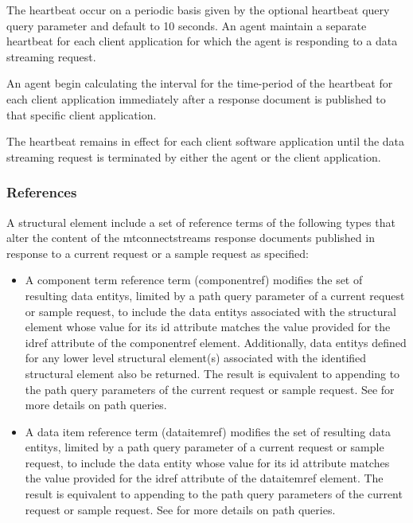 \documentclass{mtconnect}	%
\begin{document}
The \gls{heartbeat} \MUST occur on a periodic basis given by the optional \gls{heartbeat query} query parameter and \MUST default to 10 seconds.  An \gls{agent} \MUST maintain a separate \gls{heartbeat} for each client application for which the \gls{agent} is responding to a \gls{data streaming} \gls{request}.

An \gls{agent} \MUST begin calculating the interval for the time-period of the \gls{heartbeat} for each client application immediately after a \gls{response document} is published to that specific client application.

The \gls{heartbeat} remains in effect for each client software application until the \gls{data streaming} \gls{request} is terminated by either the \gls{agent} or the client application.


\subsubsection{References}
\label{sec:References}

A \gls{structural element} \MAY include a set of \glspl{reference term} of the following types that \MAY alter the content of the \glspl{mtconnectstreams response document} published in response to a \gls{current request} or a \gls{sample request} as specified:

\begin{itemize}
\item A \gls{component term} \gls{reference term} (\gls{componentref}) modifies the set of resulting \glspl{data entity}, limited by a path query parameter of a \gls{current request} or \gls{sample request}, to include the \glspl{data entity} associated with the \gls{structural element} whose value for its \gls{id} attribute matches the value provided for the \gls{idref} attribute of the \gls{componentref} element. Additionally, \glspl{data entity} defined for any \gls{lower level} \gls{structural element}(s) associated with the identified \gls{structural element} \MUST also be returned. The result is equivalent to appending \cfont{//[@id=<"idRef">]} to the path query parameters of the \gls{current request} or \gls{sample request}. See  for more details on path queries.

\item A \gls{data item} \gls{reference term} (\gls{dataitemref}) modifies the set of resulting \glspl{data entity}, limited by a path query parameter of a \gls{current request} or \gls{sample request}, to include the \gls{data entity} whose value for its \gls{id} attribute matches the value provided for the \gls{idref} attribute of the \gls{dataitemref} element. The result is equivalent to appending \cfont{//[@id=<"idRef">]} to the path query parameters of the \gls{current request} or \gls{sample request}. See  for more details on path queries.
\end{itemize}
\end{document}
